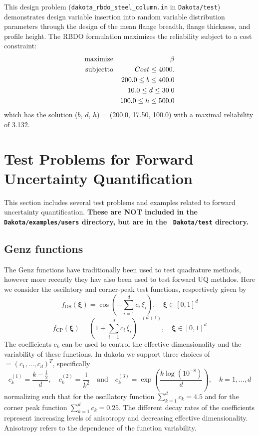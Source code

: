 This design problem (\texttt{dakota\_rbdo\_steel\_column.in} in
\texttt{Dakota/test}) demonstrates design variable insertion into
random variable distribution parameters through the design of the mean
flange breadth, flange thickness, and profile height. The RBDO
formulation maximizes the reliability subject to a cost constraint:
\begin{eqnarray}
{\rm maximize }   & & \beta                   \nonumber \\
{\rm subject to } & & Cost  \leq 4000.       \nonumber \\
                  & & 200.0 \leq b \leq 400.0 \\
                  & &  10.0 \leq d \leq  30.0 \nonumber \\
                  & & 100.0 \leq h \leq 500.0 \nonumber
\end{eqnarray}
which has the solution ($b$, $d$, $h$) = (200.0, 17.50, 100.0) with a
maximal reliability of 3.132.

\section{Test Problems for Forward Uncertainty Quantification}\label{additional:reliabilityproblems}
This section includes several test problems and examples related to
forward uncertainty quantification. {\bf These are NOT included in the
  {\tt Dakota/examples/users} directory, but are in the {\tt
    Dakota/test} directory.}

\subsection{Genz functions}
The Genz functions have traditionally been used to test quadrature
methods, however more recently they hav also been used to test forward
UQ methdos. Here we consider the oscilatory and corner-peak test
functions, respectively given by
\[
 f_{\mathrm{OS}}(\boldsymbol{\xi})=\cos\left(-\sum_{i=1}^d c_i\, \xi_i \right),\quad \boldsymbol{\xi}\in[0,1]^d
\]
\[
 f_{\mathrm{CP}}(\boldsymbol{\xi})=\left(1+\sum_{i=1}^d c_i\, \xi_i \right)^{-(d+1)},\quad \boldsymbol{\xi}\in[0,1]^d
\]
The coefficients $c_k$ can be used to control the effective dimensionality
and the variability of these functions. In dakota we support three
choices of $\boldsymbol = (c_1,\ldots,c_d)^T$, specifically
\[
c^{(1)}_k=\frac{k-\frac{1}{2}}{d},\quad c_k^{(2)}=\frac{1}{k^2}\quad \text{and}
\quad c_k^{(3)} = \exp\left(\frac{k\log(10^{-8})}{d}\right), \quad k=1,\ldots,d
\]
normalizing such that for the oscillatory function $\sum_{k=1}^d c_k =
4.5$ and for the corner peak function $\sum_{k=1}^d c_k = 0.25$. The
different decay rates of the coefficients represent increasing levels
of anisotropy and decreasing effective dimensionality. Anisotropy
refers to the dependence of the function variability.

